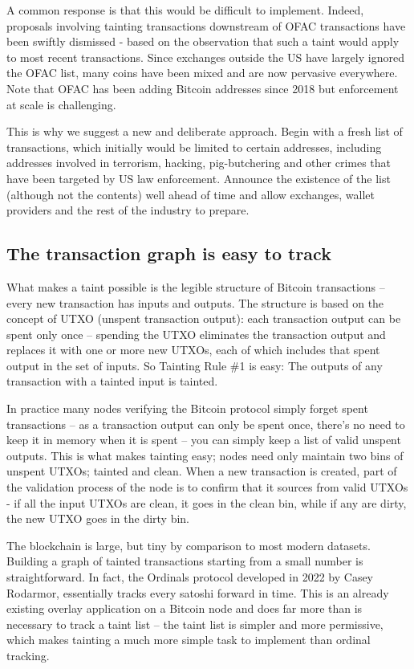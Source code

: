 \documentclass{article}%
\begin{document}
A common response is that this would be difficult to implement.  Indeed, proposals involving tainting transactions downstream of OFAC transactions have been
swiftly dismissed - based on the observation that such a taint would apply to most recent transactions.   Since exchanges
outside the US have largely ignored the OFAC list, many coins have been mixed and
are now pervasive everywhere. Note that OFAC has been adding Bitcoin addresses since 2018 \cite{OFAC2018SamSam} but enforcement at scale is challenging.

This is why we suggest a new and deliberate approach.  Begin with a fresh list
of transactions, which initially would be limited to certain addresses,
including addresses
involved in terrorism, hacking, pig-butchering and other crimes that have been targeted
by US law enforcement.  Announce the existence of the list (although not the contents) well ahead of time and allow
exchanges, wallet providers and the rest of the industry to prepare.

\subsection{The transaction graph is easy to track}

What makes a taint possible is the legible structure of Bitcoin transactions
-- every new transaction has inputs and outputs. The structure is based on the
concept of UTXO (unspent transaction output): each transaction output can be spent
only once -- spending the UTXO eliminates the transaction output and replaces it with
one or more new UTXOs, each of which includes that spent output in the set of inputs.
 So Tainting Rule \#1 is easy: The outputs of any transaction with a tainted input is tainted.

In practice many nodes verifying the Bitcoin protocol simply forget spent
transactions -- as a transaction output can only be spent once, there's no need
to keep it in memory when it is spent -- you can simply keep a list of valid unspent
outputs.  This is what makes tainting easy; nodes need only maintain two
bins of unspent UTXOs; tainted and clean. When a new transaction is created,
part of the validation process of the node is to confirm that it sources from valid
UTXOs - if all the input UTXOs are clean, it goes in the clean bin, while if any are
dirty, the new UTXO goes in the dirty bin.

The blockchain is large, but tiny by comparison to most modern datasets.
 Building a graph of tainted transactions starting from a small number is
straightforward.  In fact, the Ordinals protocol developed in 2022 by Casey
Rodarmor, essentially tracks every satoshi forward in time.  This is an already existing
overlay application on a Bitcoin node and does far more than is
necessary to track a taint list -- the taint list is simpler and more
permissive, which makes tainting a much more simple task to implement than
ordinal tracking.
\end{document}
